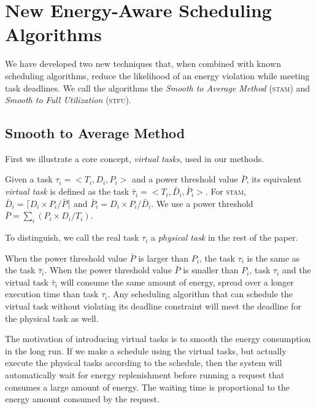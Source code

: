 
\section{New Energy-Aware Scheduling Algorithms} \label{sec:algorithms}
We have developed two new techniques that, when combined with known scheduling algorithms, reduce the likelihood of an energy violation while meeting task deadlines.  We call the algorithms the \emph{Smooth to Average Method} (\textsc{stam}) and \emph{Smooth to Full Utilization} (\textsc{stfu}).

\subsection{Smooth to Average Method}
First we illustrate a core concept, \emph{virtual tasks}, used in our methods.

\begin{definition}
Given a task $\tau_i = <T_i, D_i, P_i>$ and a power threshold value $\bar{P}$, its equivalent \emph{virtual task} is defined as the task $\bar{\tau}_i = <T_i, \bar{D}_i, \bar{P}_i>$.  For \textsc{stam}, $\bar{D}_i = \lceil D_i \times  P_i / \bar{P} \rceil$ and $\bar{P}_i = D_i \times  P_i / \bar{D}_i$.  We use a power threshold $\bar{P} = \sum_i (P_i \times D_i / T_i )$.
\end{definition}

To distinguish, we call the real task $\tau_i$ a \emph{physical task} in the rest of the paper.

\begin{remark}
When the power threshold value $\bar{P}$ is larger than $P_i$, the task $\tau_i$ is the same as the task $\bar{\tau}_i$. When the power threshold value $\bar{P}$ is smaller than $P_i$, task $\tau_i$ and the virtual task $\bar{\tau}_i$ will consume the same amount of energy, spread over a longer execution time than task $\tau_i$.  Any scheduling algorithm that can schedule the virtual task without violating its deadline constraint will meet the deadline for the physical task as well.
\end{remark}
\begin{remark}
The motivation of introducing virtual tasks is to smooth the energy consumption in the long run. If we make a schedule using the virtual tasks, but actually execute the physical tasks according to the schedule, then the system will automatically wait for energy replenishment before running a request that consumes a large amount of energy. The waiting time is proportional to the energy amount consumed by the request.
\end{remark}

